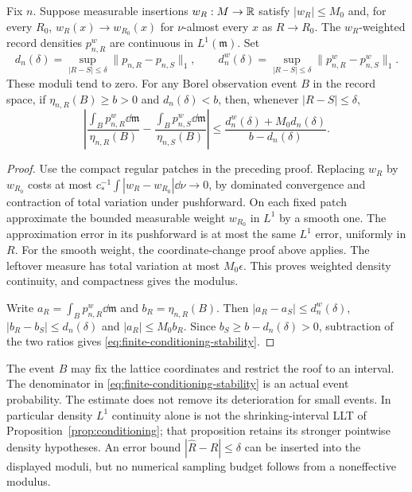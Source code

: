 \begin{proposition}
\label{prop:weighted-return-stability}
Fix $n$. Suppose measurable insertions $w_R:M\to\mathbb R$ satisfy
$|w_R|\le M_0$ and, for every $R_0$, $w_R(x)\to w_{R_0}(x)$ for
$\nu$-almost every $x$ as $R\to R_0$. The $w_R$-weighted record
densities $p^w_{n,R}$ are continuous in $L^1(\mathfrak m)$.
Set
\[
 d_n(\delta)=\sup_{|R-S|\le\delta}\|p_{n,R}-p_{n,S}\|_1,
 \qquad
 d_n^w(\delta)=\sup_{|R-S|\le\delta}\|p^w_{n,R}-p^w_{n,S}\|_1.
\]
These moduli tend to zero. For any Borel observation event $B$ in the
record space, if $\eta_{n,R}(B)\ge b>0$ and
$d_n(\delta)<b$, then, whenever $|R-S|\le\delta$,
\begin{equation}\label{eq:finite-conditioning-stability}
 \left|\frac{\int_Bp^w_{n,R}\dd\mathfrak m}{\eta_{n,R}(B)}
       -\frac{\int_Bp^w_{n,S}\dd\mathfrak m}{\eta_{n,S}(B)}\right|
 \le\frac{d_n^w(\delta)+M_0d_n(\delta)}{b-d_n(\delta)}.
\end{equation}
\end{proposition}
\begin{proof}
Use the compact regular patches in the preceding proof. Replacing
$w_R$ by $w_{R_0}$ costs at most
$c_*^{-1}\int|w_R-w_{R_0}|\dd\nu\to0$, by dominated convergence
and contraction of total variation under pushforward. On each fixed
patch approximate the bounded measurable weight $w_{R_0}$ in $L^1$
by a smooth one. The approximation error in its pushforward is at
most the same $L^1$ error, uniformly in $R$. For the smooth weight,
the coordinate-change proof above applies. The leftover measure has
total variation at most $M_0\epsilon$. This proves weighted density
continuity, and compactness gives the modulus.

Write $a_R=\int_Bp^w_{n,R}\dd\mathfrak m$ and
$b_R=\eta_{n,R}(B)$. Then
$|a_R-a_S|\le d_n^w(\delta)$,
$|b_R-b_S|\le d_n(\delta)$ and $|a_R|\le M_0b_R$.
Since $b_S\ge b-d_n(\delta)>0$, subtraction of the two ratios gives
\eqref{eq:finite-conditioning-stability}.
\end{proof}

The event $B$ may fix the lattice coordinates and restrict the roof
to an interval. The denominator in
\eqref{eq:finite-conditioning-stability} is an actual event probability.
The estimate does not remove its deterioration for small events. In
particular density $L^1$ continuity alone is not the shrinking-interval
LLT of Proposition~\ref{prop:conditioning}; that proposition retains
its stronger pointwise density hypotheses. An error bound
$|\widehat R-R|\le\delta$ can be inserted into the displayed moduli,
but no numerical sampling budget follows from a noneffective modulus.


